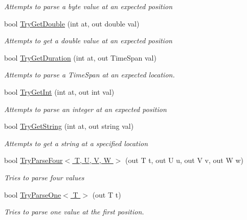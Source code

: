\begin{DoxyCompactItemize}
\begin{DoxyCompactList}\small\item\em Attempts to parse a byte value at an expected position \end{DoxyCompactList}\item 
bool \hyperlink{classOTA_1_1Command_1_1ArgumentList_acbe2ecbdbb2308ca8575c218ee58ef13}{Try\+Get\+Double} (int at, out double val)
\begin{DoxyCompactList}\small\item\em Attempts to get a double value at an expected position \end{DoxyCompactList}\item 
bool \hyperlink{classOTA_1_1Command_1_1ArgumentList_abf848ae58e85d764d8e9c2b11e445b22}{Try\+Get\+Duration} (int at, out Time\+Span val)
\begin{DoxyCompactList}\small\item\em Attempts to parse a Time\+Span at an expected location. \end{DoxyCompactList}\item 
bool \hyperlink{classOTA_1_1Command_1_1ArgumentList_aa5b6f61faa9b8c2a10c98edf74d3f84d}{Try\+Get\+Int} (int at, out int val)
\begin{DoxyCompactList}\small\item\em Attempts to parse an integer at an expected position \end{DoxyCompactList}\item 
bool \hyperlink{classOTA_1_1Command_1_1ArgumentList_a3c1e74c016c23bd91fe70ab4e8605e27}{Try\+Get\+String} (int at, out string val)
\begin{DoxyCompactList}\small\item\em Attempts to get a string at a specified location \end{DoxyCompactList}\item 
bool \hyperlink{classOTA_1_1Command_1_1ArgumentList_ae05e034dd555e3f144313d7afda1b240}{Try\+Parse\+Four$<$ T, U, V, W $>$} (out T t, out U u, out V v, out W w)
\begin{DoxyCompactList}\small\item\em Tries to parse four values \end{DoxyCompactList}\item 
bool \hyperlink{classOTA_1_1Command_1_1ArgumentList_a6eeeee97bb0e3c1bc5934be86b1481b1}{Try\+Parse\+One$<$ T $>$} (out T t)
\begin{DoxyCompactList}\small\item\em Tries to parse one value at the first position. \end{DoxyCompactList}\item 

\end{DoxyCompactItemize}
